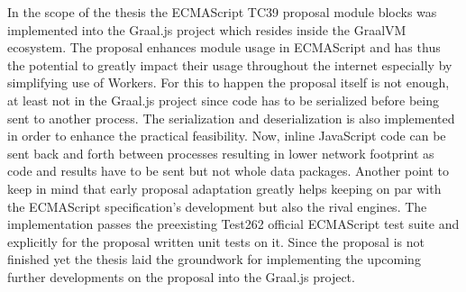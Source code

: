 
In the scope of the thesis the ECMAScript TC39 proposal module blocks was implemented into the Graal.js project which resides inside the GraalVM ecosystem. The proposal enhances module usage in ECMAScript and has thus the potential to greatly impact their usage throughout the internet especially by simplifying use of Workers. For this to happen the proposal itself is not enough, at least not in the Graal.js project since code has to be serialized before being sent to another process. The serialization and deserialization is also implemented in order to enhance the practical feasibility. Now, inline JavaScript code can be sent back and forth between processes resulting in lower network footprint as code and results have to be sent but not whole data packages. Another point to keep in mind that early proposal adaptation greatly helps keeping on par with the ECMAScript specification's development but also the rival engines. The implementation passes the preexisting Test262 official ECMAScript test suite and explicitly for the proposal written unit tests on it. Since the proposal is not finished yet the thesis laid the groundwork for implementing the upcoming further developments on the proposal into the Graal.js project.


